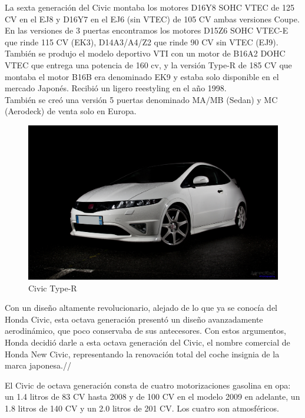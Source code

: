 \documentclass[10pt,a4paper]{report}
\begin{document}
La sexta generación del Civic montaba los motores D16Y8 SOHC VTEC de 125 CV en el EJ8 y D16Y7 en el EJ6 (sin VTEC) de 105 CV ambas versiones Coupe. En las versiones de 3 puertas encontramos los motores D15Z6 SOHC VTEC-E que rinde 115 CV (EK3), D14A3/A4/Z2 que rinde 90 CV sin VTEC (EJ9). También se produjo el modelo deportivo VTI con un motor de B16A2 DOHC VTEC que entrega una potencia de 160 cv, y la versión Type-R de 185 CV que montaba el motor B16B era denominado EK9 y estaba solo disponible en el mercado Japonés. Recibió un ligero reestyling en el año 1998.
\\
También se creó una versión 5 puertas denominado MA/MB (Sedan) y MC (Aerodeck) de venta solo en Europa.

\begin{figure}
    \includegraphics[scale=0.50]{fn2.jpg}
  \caption{Civic Type-R}
\end{figure}
Con un diseño altamente revolucionario, alejado de lo que ya se conocía del Honda Civic, esta octava generación presentó un diseño avanzadamente aerodinámico, que poco conservaba de sus antecesores. Con estos argumentos, Honda decidió darle a esta octava generación del Civic, el nombre comercial de Honda New Civic, representando la renovación total del coche insignia de la marca japonesa.//

El Civic de octava generación consta de cuatro motorizaciones gasolina en opa: un 1.4 litros de 83 CV hasta 2008 y de 100 CV en el modelo 2009 en adelante, un 1.8 litros de 140 CV y un 2.0 litros de 201 CV. Los cuatro son atmosféricos.

\newpage
\end{document}
